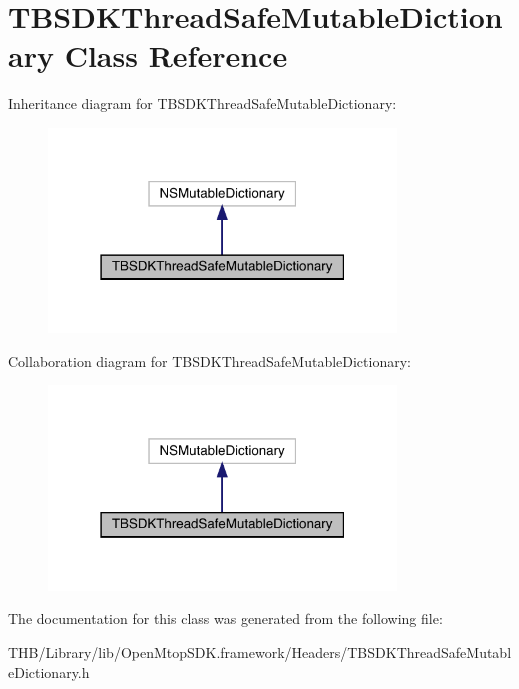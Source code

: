 \hypertarget{interface_t_b_s_d_k_thread_safe_mutable_dictionary}{}\section{T\+B\+S\+D\+K\+Thread\+Safe\+Mutable\+Dictionary Class Reference}
\label{interface_t_b_s_d_k_thread_safe_mutable_dictionary}


Inheritance diagram for T\+B\+S\+D\+K\+Thread\+Safe\+Mutable\+Dictionary\+:\nopagebreak
\begin{figure}[H]
\begin{center}
\leavevmode
\includegraphics[width=262pt]{interface_t_b_s_d_k_thread_safe_mutable_dictionary__inherit__graph}
\end{center}
\end{figure}


Collaboration diagram for T\+B\+S\+D\+K\+Thread\+Safe\+Mutable\+Dictionary\+:\nopagebreak
\begin{figure}[H]
\begin{center}
\leavevmode
\includegraphics[width=262pt]{interface_t_b_s_d_k_thread_safe_mutable_dictionary__coll__graph}
\end{center}
\end{figure}


The documentation for this class was generated from the following file\+:\begin{DoxyCompactItemize}
\item 
T\+H\+B/\+Library/lib/\+Open\+Mtop\+S\+D\+K.\+framework/\+Headers/T\+B\+S\+D\+K\+Thread\+Safe\+Mutable\+Dictionary.\+h\end{DoxyCompactItemize}
